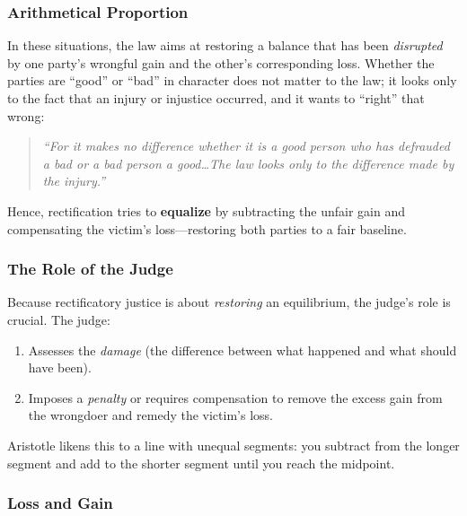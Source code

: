                \subsubsection{Arithmetical Proportion}

                    In these situations, the law aims at restoring a balance that has been \textit{disrupted} by one party's wrongful gain and the other's corresponding loss. Whether the parties are ``good'' or ``bad'' in character does not matter to the law; it looks only to the fact that an injury or injustice occurred, and it wants to ``right'' that wrong:

                    \begin{quote}
                    \textit{``For it makes no difference whether it is a good person who has defrauded a bad or a bad person a good\ldots The law looks only to the difference made by the injury.''}
                    \end{quote}

                    Hence, rectification tries to \textbf{equalize} by subtracting the unfair gain and compensating the victim's loss---restoring both parties to a fair baseline.

                \subsubsection{The Role of the Judge}

                    Because rectificatory justice is about \textit{restoring} an equilibrium, the judge's role is crucial. The judge:
                    \begin{enumerate}
                      \item Assesses the \textit{damage} (the difference between what happened and what should have been).
                      \item Imposes a \textit{penalty} or requires compensation to remove the excess gain from the wrongdoer and remedy the victim's loss.
                    \end{enumerate}

                    Aristotle likens this to a line with unequal segments: you subtract from the longer segment and add to the shorter segment until you reach the midpoint.

                \subsubsection{Loss and Gain}

